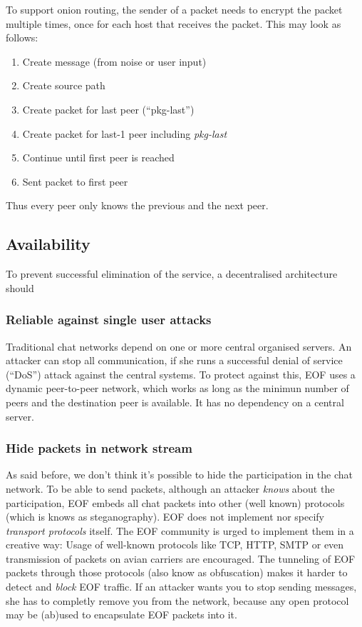 To support onion routing, the sender of a packet needs to encrypt the packet
multiple times, once for each host that receives the packet. This may look
as follows:
\begin{enumerate}
\item Create message (from noise or user input)
\item Create source path
\item Create packet for last peer ("`pkg-last"')
\item Create packet for last-1 peer including \emph{pkg-last}
\item Continue until first peer is reached
\item Sent packet to first peer 
\end{enumerate}
Thus every peer only knows the previous and the next peer.


\subsection{Availability}
To prevent
successful elimination of the service, a decentralised architecture should


\subsubsection{Reliable against single user attacks}
Traditional chat networks depend on one or more central organised servers.
An attacker can stop all communication, if she runs a successful denial
of service ("`DoS"') attack against the central systems.
To protect against this, EOF uses a dynamic peer-to-peer network, which works
as long as the minimun number of peers and the destination peer is available.
It has no dependency on a central server.

\subsubsection{Hide packets in network stream}
As said before, we don't think it's possible to hide the participation in the
chat network. To be able to send packets, although an attacker \emph{knows}
about the participation, EOF embeds all chat packets into other (well known)
protocols (which is knows as steganography\cite{stegano-1}).
EOF does not implement nor specify \emph{transport protocols} itself.
The EOF community is urged to implement them in a creative way: Usage
of well-known protocols like TCP\cite{tcp-1}, HTTP\cite{http-1},
SMTP\cite{smtp-1} or even transmission of packets on avian
carriers\cite{avian-1} are encouraged. The tunneling of EOF packets through
those protocols (also know as obfuscation) makes it harder to detect
and \emph{block} EOF traffic. 
If an attacker wants you to stop sending messages, she has to completly
remove you from the network, because any open protocol may be (ab)used to
encapsulate EOF packets into it.




